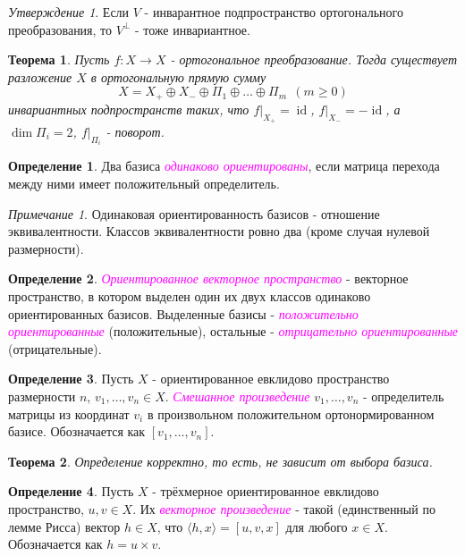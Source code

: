 \documentclass[a4paper,100pt]{article}
\theoremstyle{indented}
\newtheorem{theorem}{Теорема}
\theoremstyle{definition}
\newtheorem{defn}{Определение}
\theoremstyle{remark}
\newtheorem{remark}{Примечание}
\newtheorem{stat}{Утверждение}
\DeclareMathOperator{\ra}{\rightarrow}
\DeclareMathOperator{\id}{id}
\begin{document}
\begin{stat}
    Если $V$ - инварантное подпространство ортогонального преобразования, то $V^{\perp}$ - тоже инвариантное.
\end{stat}

\begin{theorem}
    Пусть $f:X\ra X$ - ортогональное преобразование. Тогда существует разложение $X$ в ортогональную прямую сумму
    \[
        X=X_+ \oplus X_- \oplus \Pi_1 \oplus \ldots \oplus \Pi_m \: \: (m\geq 0)
    \]
    инвариантных подпространств таких, что $f|_{X_+}=\id$, $f|_{X_-}=-\id$, а $\dim \Pi_i=2$, $f|_{\Pi_i}$ - поворот.
\end{theorem}

\begin{defn}
    Два базиса \textit{\textcolor{magenta}{\hypertarget{s78}{одинаково ориентированы}}}, если матрица перехода между ними имеет положительный определитель.
\end{defn}

\begin{remark}
    Одинаковая ориентированность базисов - отношение эквивалентности. Классов эквивалентности ровно два (кроме случая нулевой размерности).
\end{remark}

\begin{defn}
    \textit{\textcolor{magenta}{\hypertarget{s79}{Ориентированное векторное пространство}}} - векторное пространство, в котором выделен один их двух классов одинаково ориентированных базисов. Выделенные базисы - \textit{\textcolor{magenta}{\hypertarget{s80}{положительно ориентированные}}} (положительные), остальные - \textit{\textcolor{magenta}{\hypertarget{s81}{отрицательно ориентированные}}} (отрицательные).
\end{defn}

\begin{defn}
    Пусть $X$ - ориентированное евклидово пространство размерности $n$, $v_1, \ldots, v_n \in X$. \textit{\textcolor{magenta}{\hypertarget{s82}{Смешанное произведение}}} $v_1, \ldots, v_n$ - определитель матрицы из координат $v_i$ в произвольном положительном ортонормированном базисе. Обозначается как $[v_1, \ldots, v_n]$. 
\end{defn}

\begin{theorem}
    Определение корректно, то есть, не зависит от выбора базиса.
\end{theorem}

\begin{defn}
    Пусть $X$ - трёхмерное ориентированное евклидово пространство, $u, v\in X$. Их \textit{\textcolor{magenta}{\hypertarget{s83}{векторное произведение}}} - такой (единственный по лемме Рисса) вектор $h\in X$, что $\langle h, x\rangle = [u, v, x]$ для любого $x\in X$. Обозначается как $h=u\times v$. 
\end{defn}
\end{document}
